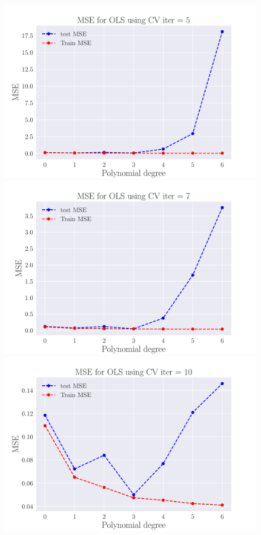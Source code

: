 \documentclass[reprint,english,notitlepage,aps,nobalancelastpage,nofootinbib]{revtex4-1}  %
\begin{document}
\begin{figure}[h]
	\includegraphics[width=\linewidth]{MSE_OLS_n30_eps02_pol6_CV_re5.pdf}
	\endminipage\hfill
	\includegraphics[width=\linewidth]{MSE_OLS_n30_eps02_pol6_CV_re7.pdf}
	\endminipage\hfill
	\includegraphics[width=\linewidth]{MSE_OLS_n30_eps02_pol6_CV_re10.pdf}

\end{figure}
\end{document}
